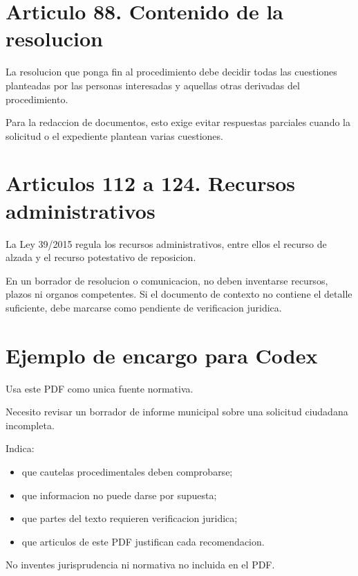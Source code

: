 \documentclass[a4paper,12pt]{article}
\begin{document}
\section*{Articulo 88. Contenido de la resolucion}

La resolucion que ponga fin al procedimiento debe decidir todas las cuestiones planteadas por las personas interesadas y aquellas otras derivadas del procedimiento.

Para la redaccion de documentos, esto exige evitar respuestas parciales cuando la solicitud o el expediente plantean varias cuestiones.

\section*{Articulos 112 a 124. Recursos administrativos}

La Ley 39/2015 regula los recursos administrativos, entre ellos el recurso de alzada y el recurso potestativo de reposicion.

En un borrador de resolucion o comunicacion, no deben inventarse recursos, plazos ni organos competentes. Si el documento de contexto no contiene el detalle suficiente, debe marcarse como pendiente de verificacion juridica.

\section*{Ejemplo de encargo para Codex}

Usa este PDF como unica fuente normativa.

Necesito revisar un borrador de informe municipal sobre una solicitud ciudadana incompleta.

Indica:
\begin{itemize}
    \item que cautelas procedimentales deben comprobarse;
    \item que informacion no puede darse por supuesta;
    \item que partes del texto requieren verificacion juridica;
    \item que articulos de este PDF justifican cada recomendacion.
\end{itemize}

No inventes jurisprudencia ni normativa no incluida en el PDF.
\end{document}
